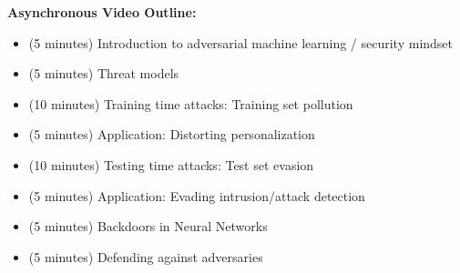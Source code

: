 \documentclass[12pt]{article}
\renewcommand{\_}{\kern-1.5pt\textunderscore\kern-1.5pt}
\begin{document}
\vspace{\baselineskip}
\textbf{Asynchronous Video Outline:}\par


\vspace{\baselineskip}
\begin{itemize}
	\item (5 minutes) Introduction to adversarial machine learning / security mindset\par

	\item (5 minutes) Threat models\par

	\item (10 minutes) Training time attacks: Training set pollution\par

	\item (5 minutes) Application: Distorting personalization\par

	\item (10 minutes) Testing time attacks: Test set evasion\par

	\item (5 minutes) Application: Evading intrusion/attack detection\par

	\item (5 minutes) Backdoors in Neural Networks\par

	\item (5 minutes) Defending against adversaries
\end{itemize}\par


\vspace{\baselineskip}

\vspace{\baselineskip}

\vspace{\baselineskip}

\vspace{\baselineskip}

\vspace{\baselineskip}

\vspace{\baselineskip}

\vspace{\baselineskip}

\vspace{\baselineskip}
\end{document}
